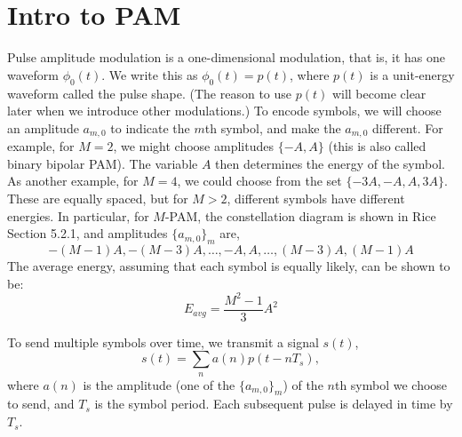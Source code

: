 




\section{Intro to PAM}

Pulse amplitude modulation is a one-dimensional modulation, that is, it has one waveform $\phi_0(t)$.  We write this as $\phi_0(t) = p(t)$, where $p(t)$ is a unit-energy waveform called the pulse shape.  (The reason to use $p(t)$ will become clear later when we introduce other modulations.)  To encode symbols, we will choose an amplitude $a_{m,0}$ to indicate the $m$th symbol, and make the $a_{m,0}$ different.  For example, for $M=2$, we might choose amplitudes $\{-A, A\}$ (this is also called binary bipolar PAM).  The variable $A$ then determines the energy of the symbol.  As another example, for $M=4$, we could choose from the set $\{-3A, -A, A, 3A\}$.  These are equally spaced, but for $M> 2$, different symbols have different energies.  In particular, for $M$-PAM, the constellation diagram is shown in Rice Section 5.2.1, %
and amplitudes $\{a_{m,0}\}_m$ are,
\[
 -(M-1)A, -(M-3)A, \ldots, -A, A, \ldots, (M-3)A, (M-1)A
\]
The average energy, assuming that each symbol is equally likely, can be shown to be:
\[
 E_{avg} = \frac{M^2-1}{3}A^2
\]

To send multiple symbols over time, we transmit a signal $s(t)$,
\[
 s(t) = \sum_n a(n) p(t-nT_s),
\]
where $a(n)$ is the amplitude (one of the $\{a_{m,0}\}_m$) of the $n$th symbol we choose to send, and $T_s$ is the symbol period.  Each subsequent pulse is delayed in time by $T_s$.  


